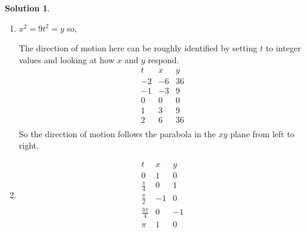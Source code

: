 \documentclass[10pt]{article}
\theoremstyle{definition}
\newtheorem{soln}{Solution}
\begin{document}
\begin{soln}~
  \begin{enumerate}[label=(\alph*)]
    \item $x^2=9t^2=y$ so,
          \begin{center}
          \end{center}
          The direction of motion here can be roughly identified by setting $t$ to integer values and looking at how $x$ and $y$ respond.
          \begin{displaymath}
            \begin{array}{|c|c|c|}
              t  & x  & y  \\
              \hline
              -2 & -6 & 36 \\
              -1 & -3 & 9  \\
              0  & 0  & 0  \\
              1  & 3  & 9  \\
              2  & 6  & 36 \\
            \end{array}
          \end{displaymath}
          So the direction of motion follows the parabola in the $xy$ plane from left to right.
    \item
          \begin{displaymath}
            \begin{array}{|c|c|c|}
              t              & x  & y  \\
              \hline
              0              & 1  & 0  \\
              \frac{\pi}{4}  & 0  & 1  \\
              \frac{\pi}{2}  & -1 & 0  \\
              \frac{3\pi}{4} & 0  & -1 \\
              \pi            & 1  & 0  \\
            \end{array}
          \end{displaymath}
          \begin{center}
            \begin{tikzpicture}

\end{tikzpicture}
\end{center}
\end{enumerate}
\end{soln}
\end{document}
